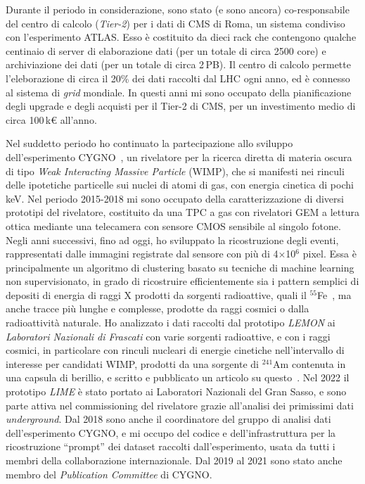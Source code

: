 \documentclass[a4paper,12pt,twoside]{article}
\begin{document}
{  Durante il periodo in considerazione, sono stato (e sono ancora)
  co-responsabile del centro di calcolo (\textit{Tier-2}) per i dati
  di CMS di Roma, un sistema condiviso con l'esperimento ATLAS. Esso
  \`e costituito da dieci rack che contengono qualche centinaio di
  server di elaborazione dati (per un totale di circa 2500 core) e
  archiviazione dei dati (per un totale di circa 2\,PB). Il centro di
  calcolo permette l'eleborazione di circa il 20\% dei dati raccolti
  dal LHC ogni anno, ed \`e connesso al sistema di \textit{grid}
  mondiale. In questi anni mi sono occupato della pianificazione degli
  upgrade e degli acquisti per il Tier-2 di CMS, per un investimento
  medio di circa 100\,k\euro{} all'anno.

  Nel suddetto periodo ho continuato la partecipazione allo sviluppo
  dell'esperimento CYGNO~, un rivelatore
  per la ricerca diretta di materia oscura di tipo \textit{Weak
    Interacting Massive Particle} (WIMP), che si manifesti nei rinculi
  delle ipotetiche particelle sui nuclei di atomi di gas, con energia
  cinetica di pochi keV. Nel periodo 2015-2018 mi sono occupato della
  caratterizzazione di diversi prototipi del rivelatore, costituito da
  una TPC a gas con rivelatori GEM a lettura ottica mediante una
  telecamera con sensore CMOS sensibile al singolo fotone. Negli anni
  successivi, fino ad oggi, ho sviluppato la ricostruzione degli
  eventi, rappresentati dalle immagini registrate dal sensore con
  pi\`u di 4$\times$10$^6$ pixel.  Essa \`e principalmente un algoritmo
  di clustering basato su tecniche di machine learning non
  supervisionato, in grado di ricostruire efficientemente sia i
  pattern semplici di depositi di energia di raggi X prodotti da
  sorgenti radioattive, quali il
  $^{55}$Fe~, ma anche tracce pi\`u lunghe
  e complesse, prodotte da raggi cosmici o dalla radioattivit\`a
  naturale. Ho analizzato i dati raccolti dal prototipo {\it LEMON} ai
  \textit{Laboratori Nazionali di Frascati} con varie sorgenti radioattive, e
  con i raggi cosmici, in particolare con rinculi nucleari di energie
  cinetiche nell'intervallo di interesse per candidati WIMP, prodotti
  da una sorgente di $^{241}$Am contenuta in una capsula di berillio,
  e scritto e pubblicato un articolo su
  questo~.  Nel 2022 il prototipo {\it
    LIME} \`e stato portato ai Laboratori Nazionali del Gran Sasso, e
  sono parte attiva nel commissioning del rivelatore grazie
  all'analisi dei primissimi dati {\it underground}.  Dal 2018 sono
  anche il coordinatore del gruppo di analisi dati dell'esperimento
  CYGNO, e mi occupo del codice e dell'infrastruttura per la
  ricostruzione ``prompt'' dei dataset raccolti dall'esperimento,
  usata da tutti i membri della collaborazione internazionale. Dal
  2019 al 2021 sono stato anche membro del \textit{Publication
    Committee} di CYGNO.

}
\end{document}
